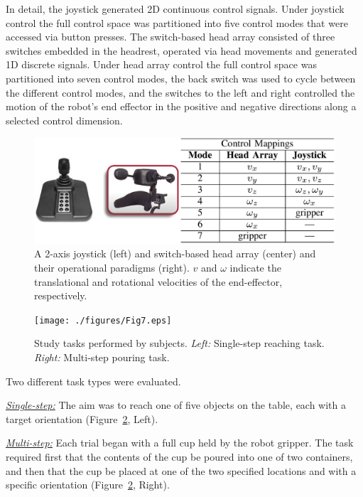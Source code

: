 \documentclass[journal]{IEEEtran}
\begin{document}
In detail, the joystick generated 2D continuous control signals. Under joystick control the full control space was partitioned into five control modes that were accessed via button presses. 	
The switch-based head array consisted of three switches embedded in the headrest, operated via head movements and generated 1D discrete signals. Under head array control the full control space was partitioned into seven control modes, the back switch was used to cycle between the different control modes, and the switches to the left and right controlled the motion of the robot's end effector in the positive and negative directions along a selected control dimension.
\begin{figure}[b]
	\centering
	\includegraphics[width = 1\hsize]{./figures/Fig6_New.eps}
	\caption{A 2-axis joystick (left) and switch-based head array (center) and their operational paradigms (right). $v$ and $\omega$ indicate the translational and rotational velocities of the end-effector, respectively. }
	\label{fig:interfaces}
\end{figure}
\begin{figure}[ht!]
	\texttt{[image: ./figures/Fig7.eps]}
	\caption{Study tasks performed by subjects. \textit{Left:} Single-step reaching task. \textit{Right:} Multi-step pouring task. }
	\label{fig:tasks}
\end{figure}

 Two different task types were evaluated.

\underline{\textit{Single-step:}} The aim was to reach one of five objects on the table, each with a target orientation (Figure~\ref{fig:tasks}, Left). 

\underline{\textit{Multi-step:}} Each trial began with a full cup held by the robot gripper. The task required first that the contents of the cup be poured into one of two containers, and then that the cup be placed at one of the two specified locations and with a specific orientation (Figure~\ref{fig:tasks}, Right). 
\end{document}
